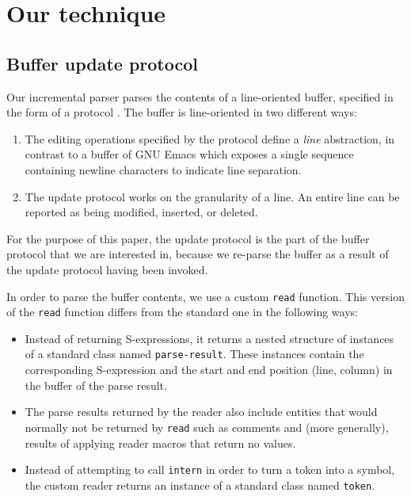 \section{Our technique}

\subsection{Buffer update protocol}

Our incremental parser parses the contents of a line-oriented buffer,
specified in the form of a \clos{} protocol
\cite{Strandh:2016:CPE:3005729.3005732}.  The buffer is line-oriented
in two different ways:

\begin{enumerate}
\item The editing operations specified by the protocol define a
  \emph{line} abstraction, in contrast to a buffer of GNU Emacs
  \cite{Finseth:1980:TPTa} which exposes a single sequence containing
  newline characters to indicate line separation.
\item The update protocol works on the granularity of a line.  An
  entire line can be reported as being modified, inserted, or
  deleted.
\end{enumerate}

For the purpose of this paper, the update protocol is the part of the
buffer protocol that we are interested in, because we re-parse the
buffer as a result of the update protocol having been invoked.

In order to parse the buffer contents, we use a custom \texttt{read}
function.  This version of the \texttt{read} function differs from the
standard one in the following ways:

\begin{itemize}
\item Instead of returning S-expressions, it returns a nested
  structure of instances of a standard class named
  \texttt{parse-result}.  These instances contain the corresponding
  S-expression and the start and end position (line, column) in the
  buffer of the parse result.
\item The parse results returned by the reader also include entities
  that would normally not be returned by \texttt{read} such as
  comments and (more generally), results of applying reader macros
  that return no values.
\item Instead of attempting to call \texttt{intern} in order to turn a
  token into a symbol, the custom reader returns an instance of a
  standard class named \texttt{token}.
\end{itemize}

